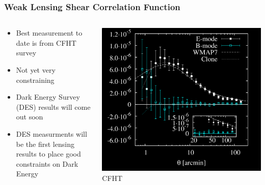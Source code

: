 \documentclass{beamer}
\begin{document}
{\begin{columns}
\begin{column}{0.5\textwidth}
        \end{column}

    \end{columns}


}



\frame
{

    \frametitle{Weak Lensing Shear Correlation Function}


    \begin{columns}
        \begin{column}{0.5\textwidth}
            \begin{itemize}

                \item Best measurement to date is from CFHT survey

                \item Not yet very constraining

                \item Dark Energy Survey (DES) results will come out soon
                    
                \item DES measurments will be the first lensing results to place good
                    constraints on Dark Energy


            \end{itemize}

        \end{column}
        \begin{column}{0.5\textwidth}
            \begin{center}
                \includegraphics[width=\textwidth]{map-inv.png}
                \newline
                {\tiny CFHT}
            \end{center}
        \end{column}

    \end{columns}


}
\end{document}
